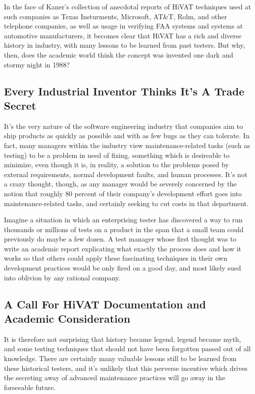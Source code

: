 In the face of Kaner's collection of anecdotal reports of HiVAT techniques used at such companies as Texas Insturments, Microsoft, AT\&T, Rolm, and other telephone companies, as well as usage in verifying FAA systems and systems at automotive manufacturers, it becomes clear that HiVAT has a rich and diverse history in industry, with many lessons to be learned from past testers. But why, then, does the academic world think the concept was invented one dark and stormy night in 1988?

\subsection{Every Industrial Inventor Thinks It's A Trade Secret}
It's the very nature of the software engineering industry that companies aim to ship products as quickly as possible and with as few bugs as they can tolerate. In fact, many managers within the industry view maintenance-related tasks (such as testing) to be a problem in need of fixing, something which is desireable to minimize, even though it is, in reality, a solution to the problems posed by external requirements, normal development faults, and human processes.\citep{glass2002Facts} It's not a crazy thought, though, as any manager would be severely concerned by the notion that roughly 80 percent of their company's development effort goes into maintenance-related tasks, and certainly seeking to cut costs in that department.\citep{pigoski1996practical}

Imagine a situation in which an enterprising tester has discovered a way to run thousands or millions of tests on a product in the span that a small team could previously do maybe a few dozen. A test manager whose first thought was to write an academic report explicating what exactly the process does and how it works so that others could apply these fascinating techniques in their own development practices would be only fired on a good day, and most likely sued into oblivion by any rational company.

\subsection{A Call For HiVAT Documentation and Academic Consideration}
It is therefore not surprising that history became legend, legend became myth, and some testing techniques that should not have been forgotten passed out of all knowledge. There are certainly many valuable lessons still to be learned from these historical testers, and it's unlikely that this perverse incentive which drives the secreting away of advanced maintenance practices will go away in the forseeable future.

